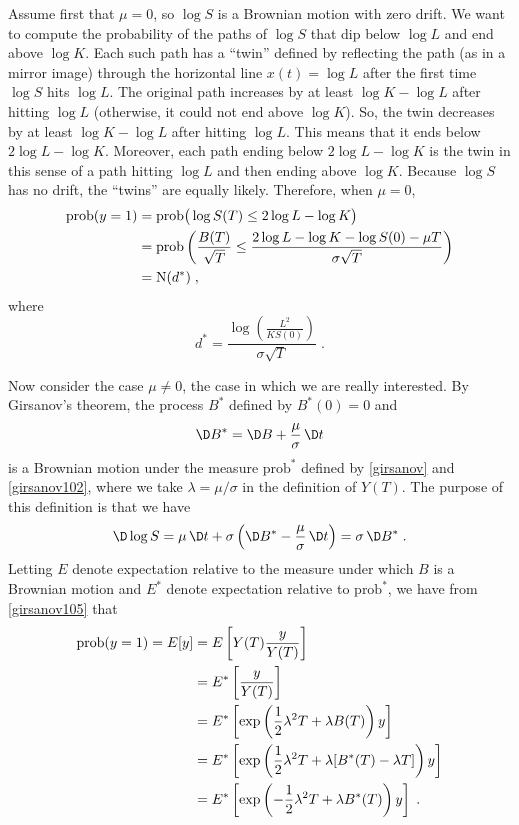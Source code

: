 Assume first that $\mu=0$, so $\log S$ is a Brownian motion with zero drift.  We want to compute the probability of the paths of $\log S$ that dip below $\log L$ and end above $\log K$.  Each such path has a ``twin'' defined by reflecting the path (as in a mirror image) through the horizontal line $x(t)=\log L$ after the first time $\log S$ hits $\log L$.  The original path increases by at least $\log K - \log L$ after hitting $\log L$ (otherwise, it could not end above $\log K$).  So, the twin decreases by at least $\log K - \log L$ after hitting $\log L$.  This means that it ends below $2\log L - \log K$.  Moreover, each path ending below $2\log L - \log K$ is the twin in this sense of a path hitting  $\log L$ and then ending above $\log K$.  Because $\log S$ has no drift, the ``twins'' are equally likely.  Therefore, when $\mu=0$,
\begin{align*}
\text{prob}(y=1) &= \text{prob}\big(\log S(T) \leq 2\log L - \log K\big)\\
&= \text{prob}\left(\frac{B(T)}{\sqrt{T}} \leq \frac{2 \log L - \log K - \log S(0)-\mu T}{\sigma\sqrt{T}}\right)\\
&= \operatorname{N}(d^*)\;,
\end{align*}
where
\begin{equation}\label{appendixc101}
d^* = \frac{\log \left(\frac{L^2}{KS(0)}\right) }{\sigma\sqrt{T}}\;.
\end{equation}

Now consider the case $\mu \neq 0$, the case in which we are really interested.  By Girsanov's theorem, the process $B^*$ defined by $B^*(0)=0$ and 
$$\D B^* = \D B + \frac{\mu}{\sigma}\,\D t$$
is a Brownian motion under the measure $\text{prob}^*$ defined by \eqref{girsanov} and \eqref{girsanov102}, where we take $\lambda = \mu/\sigma$ in the definition of $Y(T)$.  The purpose of this definition is that we have
$$\D\log S = \mu\,\D t + \sigma\left(\D B^* - \frac{\mu}{\sigma}\,\D t\right) = \sigma\,\D B^*\; .$$
Letting $E$ denote expectation relative to the measure under which $B$ is a Brownian motion and $E^*$ denote expectation relative to $\text{prob}^*$, we have from \eqref{girsanov105}  that
\begin{align}
\text{prob}(y=1) =E[y] &= E \left[Y(T)\frac{y}{Y(T)}\right]\notag\\
&= E^*\left[\frac{y}{Y(T)}\right]\notag\\
&= E^*\left[\exp\left(\frac{1}{2}\lambda^2T + \lambda B(T)\right)y\right]\notag\\
&= E^*\left[\exp\left(\frac{1}{2}\lambda^2T + \lambda [B^*(T)-\lambda T]\right)y\right]\notag\\
&=E^*\left[\exp\left(-\frac{1}{2}\lambda^2T + \lambda B^*(T)\right)y\right]\;.\label{appendixc1}
\end{align}

